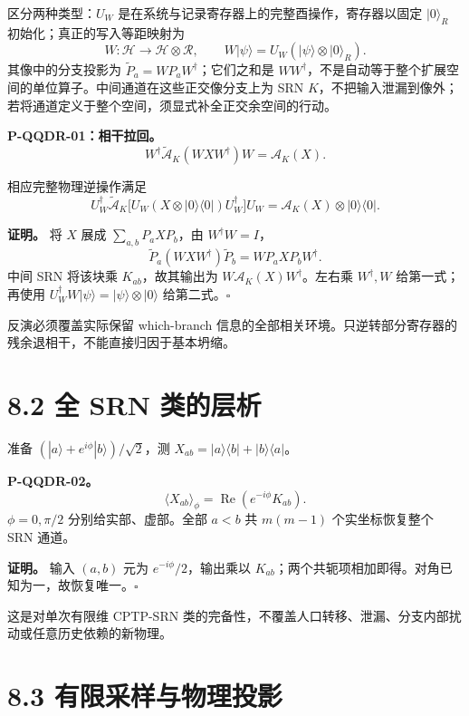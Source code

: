 \documentclass[
  11pt,
  oneside]{book}
\begin{document}
区分两种类型：\(U_W\) 是在系统与记录寄存器上的完整酉操作，寄存器以固定
\(|0\rangle_R\) 初始化；真正的写入等距映射为 \[
W:\mathcal H\to\mathcal H\otimes\mathcal R,\qquad
W|\psi\rangle=U_W(|\psi\rangle\otimes|0\rangle_R).
\] 其像中的分支投影为 \(\widetilde P_a=WP_aW^\dagger\)；它们之和是
\(WW^\dagger\)，不是自动等于整个扩展空间的单位算子。中间通道在这些正交像分支上为
SRN
\(K\)，不把输入泄漏到像外；若将通道定义于整个空间，须显式补全正交余空间的行动。

\protect\hypertarget{p-qqdr-01}{}{}

\textbf{P-QQDR-01：相干拉回。} \[
W^\dagger\widetilde{\mathcal A}_K(WXW^\dagger)W=\mathcal A_K(X).
\]

相应完整物理逆操作满足 \[
U_W^\dagger\widetilde{\mathcal A}_K
\bigl[U_W(X\otimes|0\rangle\langle0|)U_W^\dagger\bigr]U_W
=\mathcal A_K(X)\otimes|0\rangle\langle0|.
\]

\textbf{证明。} 将 \(X\) 展成 \(\sum_{a,b}P_aXP_b\)，由
\(W^\dagger W=I\)， \[
\widetilde P_a(WXW^\dagger)\widetilde P_b=WP_aXP_bW^\dagger.
\] 中间 SRN 将该块乘 \(K_{ab}\)，故其输出为
\(W\mathcal A_K(X)W^\dagger\)。左右乘 \(W^\dagger,W\) 给第一式；再使用
\(U_W^\dagger W|\psi\rangle=|\psi\rangle\otimes|0\rangle\)
给第二式。\(\square\)

反演必须覆盖实际保留 which-branch
信息的全部相关环境。只逆转部分寄存器的残余退相干，不能直接归因于基本坍缩。

\hypertarget{ux5168-srn-ux7c7bux7684ux5c42ux6790}{%
\section{8.2 全 SRN
类的层析}\label{ux5168-srn-ux7c7bux7684ux5c42ux6790}}

准备 \((|a\rangle+e^{i\phi}|b\rangle)/\sqrt2\)，测
\(X_{ab}=|a\rangle\langle b|+|b\rangle\langle a|\)。

\protect\hypertarget{p-qqdr-02}{}{}

\textbf{P-QQDR-02。} \[
\langle X_{ab}\rangle_\phi
=\operatorname{Re}(e^{-i\phi}K_{ab}).
\] \(\phi=0,\pi/2\) 分别给实部、虚部。全部 \(a<b\) 共 \(m(m-1)\)
个实坐标恢复整个 SRN 通道。

\textbf{证明。} 输入 \((a,b)\) 元为 \(e^{-i\phi}/2\)，输出乘以
\(K_{ab}\)；两个共轭项相加即得。对角已知为一，故恢复唯一。\(\square\)

这是对单次有限维 CPTP-SRN
类的完备性，不覆盖人口转移、泄漏、分支内部扰动或任意历史依赖的新物理。

\hypertarget{ux6709ux9650ux91c7ux6837ux4e0eux7269ux7406ux6295ux5f71}{%
\section{8.3
有限采样与物理投影}\label{ux6709ux9650ux91c7ux6837ux4e0eux7269ux7406ux6295ux5f71}}
\end{document}
